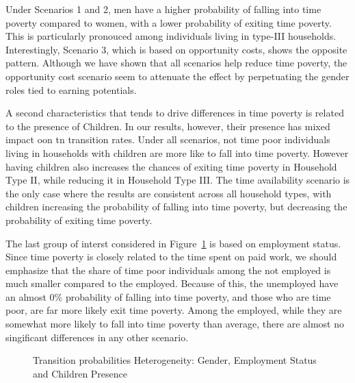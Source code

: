 \documentclass[
  11pt,
]{article}
\begin{document}
Under Scenarios 1 and 2, men have a higher probability of falling into
time poverty compared to women, with a lower probability of exiting time
poverty. This is particularly pronouced among individuals living in
type-III households. Interestingly, Scenario 3, which is based on
opportunity costs, shows the opposite pattern. Although we have shown
that all scenarios help reduce time poverty, the opportunity cost
scenario seem to attenuate the effect by perpetuating the gender roles
tied to earning potentials.

A second characteristics that tends to drive differences in time poverty
is related to the presence of Children. In our results, however, their
presence has mixed impact oon tn transition rates. Under all scenarios,
not time poor individuals living in households with children are more
like to fall into time poverty. However having children also increases
the chances of exiting time poverty in Household Type II, while reducing
it in Household Type III. The time availability scenario is the only
case where the results are consistent across all household types, with
children increasing the probability of falling into time poverty, but
decreasing the probability of exiting time poverty.

The last group of interst considered in Figure~\ref{fig-tran_by_group1}
is based on employment status. Since time poverty is closely related to
the time spent on paid work, we should emphasize that the share of time
poor individuals among the not employed is much smaller compared to the
employed. Because of this, the unemployed have an almost 0\% probability
of falling into time poverty, and those who are time poor, are far more
likely exit time poverty. Among the employed, while they are somewhat
more likely to fall into time poverty than average, there are almost no
singificant differences in any other scenario.

\begin{figure}[H]


\caption{\label{fig-tran_by_group1}Transition probabilities
Heterogeneity: Gender, Employment Status and Children Presence}

\end{figure}%
\end{document}
